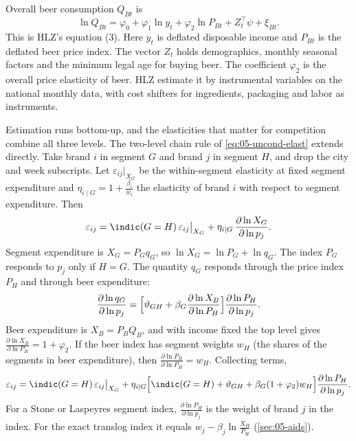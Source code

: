 Overall beer consumption $Q_{Bt}$ is
\begin{equation}\label{eq:05-hlz-top}
  \ln Q_{Bt} = \varphi_0 + \varphi_1\ln y_t + \varphi_2\ln P_{Bt} + Z_t^\top\psi + \xi_{Bt}.
\end{equation}
This is HLZ's equation (3). Here $y_t$ is deflated disposable income and $P_{Bt}$ is the deflated beer price index. The vector
$Z_t$ holds demographics, monthly seasonal factors and the minimum legal age for buying beer. The coefficient
$\varphi_2$ is the overall price elasticity of beer. HLZ estimate it by instrumental variables on the national
monthly data, with cost shifters for ingredients, packaging and labor as instruments.

Estimation runs bottom-up, and the elasticities that matter for competition combine all three levels. The
two-level chain rule of \eqref{eq:05-uncond-elast} extends directly. Take brand $i$ in segment $G$ and brand $j$
in segment $H$, and drop the city and week subscripts. Let $\varepsilon_{ij}\big|_{X_G}$ be the
within-segment elasticity at fixed segment expenditure and $\eta_{i\mid G} = 1 + \frac{\beta_i}{w_i}$ the
elasticity of brand $i$ with respect to segment expenditure. Then
\begin{equation*}
  \varepsilon_{ij} = \indic(G = H)\,\varepsilon_{ij}\big|_{X_G} + \eta_{i\mid G}\,\frac{\partial\ln X_G}{\partial\ln p_j}.
\end{equation*}
Segment expenditure is $X_G = P_Gq_G$, so $\ln X_G = \ln P_G + \ln q_G$. The index $P_G$ responds to $p_j$ only
if $H = G$. The quantity $q_G$ responds through the price index $P_H$ and through beer expenditure:
\begin{equation*}
  \frac{\partial\ln q_G}{\partial\ln p_j} = \Bigl[\vartheta_{GH} + \beta_G\frac{\partial\ln X_B}{\partial\ln P_H}\Bigr]\frac{\partial\ln P_H}{\partial\ln p_j}.
\end{equation*}
Beer expenditure is $X_B = P_BQ_B$, and with income fixed the top level gives
$\frac{\partial\ln X_B}{\partial\ln P_B} = 1 + \varphi_2$. If the beer index has segment weights $w_H$ (the shares
of the segments in beer expenditure), then $\frac{\partial\ln P_B}{\partial\ln P_H} = w_H$. Collecting terms,
\begin{equation}\label{eq:05-hlz-uncond}
  \varepsilon_{ij} = \indic(G = H)\,\varepsilon_{ij}\big|_{X_G}
  + \eta_{i\mid G}\Bigl[\indic(G = H) + \vartheta_{GH} + \beta_G(1 + \varphi_2)w_H\Bigr]\frac{\partial\ln P_H}{\partial\ln p_j}.
\end{equation}
For a Stone or Laspeyres segment index, $\frac{\partial\ln P_H}{\partial\ln p_j}$ is the weight of brand $j$ in
the index. For the exact translog index it equals $w_j - \beta_j\ln\frac{X_H}{P_H}$ (\cref{sec:05-aids}).

